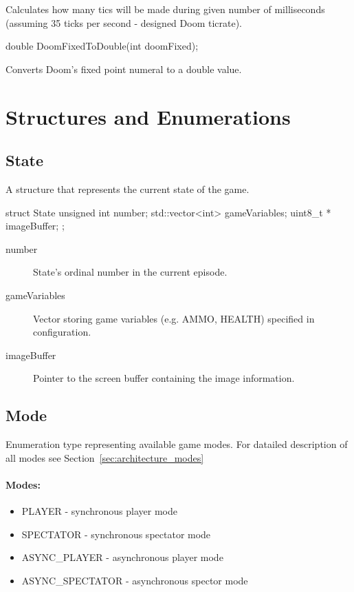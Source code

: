 	Calculates how many tics will be made during given number of milliseconds (assuming 35 ticks per second - designed Doom ticrate).


\vspace{20pt}
\begin{clinee}
double DoomFixedToDouble(int doomFixed);
\end{clinee}

	Converts Doom's fixed point numeral to a double value.


\vspace{20pt}
\section{Structures and Enumerations} \label{sec:structs}
\subsection{State}

	A structure that represents the current state of the game.

\vspace{20pt}	
\begin{clinee}
	struct State {
	    unsigned int number; 
	    std::vector<int> gameVariables;
	    uint8_t * imageBuffer;
	};
\end{clinee}
\begin{description}
	\item[number] State's ordinal number in the current episode.
	\item[gameVariables] Vector storing game variables (e.g. AMMO, HEALTH) specified in configuration. 
	\item[imageBuffer] Pointer to the screen buffer containing the image information.
\end{description}
\subsection{Mode}\label{subsec:mode}
	Enumeration type representing available game modes. For datailed description of all modes see Section~\ref{sec:architecture_modes}

\paragraph{Modes:}

\begin{itemize}
	\item PLAYER - synchronous player mode
	\item SPECTATOR - synchronous spectator mode
	\item ASYNC\_PLAYER - asynchronous player mode
	\item ASYNC\_SPECTATOR - asynchronous spector mode 
\end{itemize}

